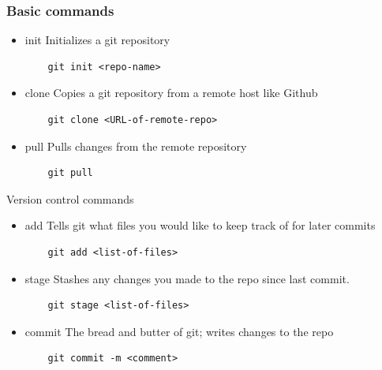 \documentclass[t]{beamer}
\begin{document}
\begin{frame}[fragile]
\frametitle{Basic commands}
\begin{itemize}
    \item init
    Initializes a git repository
    \begin{verbatim}
    git init <repo-name>
    \end{verbatim}
    \item clone
    Copies a git repository from a remote host like Github
    \begin{verbatim}
    git clone <URL-of-remote-repo>
    \end{verbatim}
    \item pull
     Pulls changes from the remote repository
    \begin{verbatim}
    git pull
    \end{verbatim}
   
\end{itemize}

\end{frame}

\begin{frame}[fragile]{Version control commands}
\begin{itemize}
    \item add
    Tells git what files you would like to keep track of for later commits
    \begin{verbatim}
    git add <list-of-files>
    \end{verbatim}
    \item stage
    Stashes any changes you made to the repo since last commit.
    \begin{verbatim}
    git stage <list-of-files>
    \end{verbatim}
    \item commit
    The bread and butter of git; writes changes to the repo
    \begin{verbatim}
    git commit -m <comment>
    \end{verbatim}

\end{itemize}

\end{frame}
\end{document}
